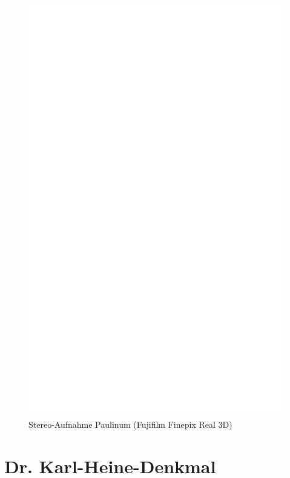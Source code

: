 \documentclass[liststotoc,bibtotoc,fontsize=14pt,]{scrreprt}
\begin{document}
		\newpage
		\begin{figure}[h]
			\includegraphics[width=\linewidth]{img/ph.jpg}
			\caption{Stereo-Aufnahme Paulinum (Fujifilm Finepix Real 3D)}
		\end{figure}

\section{Dr. Karl-Heine-Denkmal}
\label{sec:palme}
\end{document}
